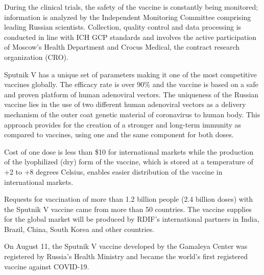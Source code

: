 During the clinical trials, the safety of the vaccine is constantly being
monitored; information is analyzed by the Independent Monitoring Committee
comprising leading Russian scientists. Collection, quality control and data
processing is conducted in line with ICH GCP standards and involves the active
participation of Moscow’s Health Department and Crocus Medical, the contract
research organization (CRO).

Sputnik V has a unique set of parameters making it one of the most competitive
vaccines globally. The efficacy rate is over 90\% and the vaccine is based on a
safe and proven platform of human adenoviral vectors. The uniqueness of the
Russian vaccine lies in the use of two different human adenoviral vectors as a
delivery mechanism of the outer coat genetic material of coronavirus to human
body. This approach provides for the creation of a stronger and long-term
immunity as compared to vaccines, using one and the same component for both
doses.

Cost of one dose is less than \$10 for international markets while the
production of the lyophilized (dry) form of the vaccine, which is stored at a
temperature of +2 to +8 degrees Celsius, enables easier distribution of the
vaccine in international markets.

Requests for vaccination of more than 1.2 billion people (2.4 billion doses)
with the Sputnik V vaccine came from more than 50 countries. The vaccine
supplies for the global market will be produced by RDIF’s international
partners in India, Brazil, China, South Korea and other countries.

On August 11, the Sputnik V vaccine developed by the Gamaleya Center was
registered by Russia’s Health Ministry and became the world’s first registered
vaccine against COVID-19.


